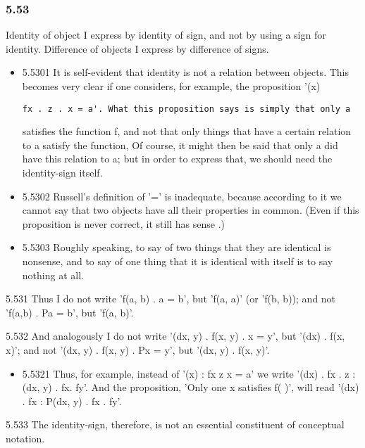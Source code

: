 \documentclass[11pt]{article}
\begin{document}
\subsubsection*{5.53}
\label{sec:org6cc3c69}
Identity of object I express by identity of sign, and not by using a
sign for identity. Difference of objects I express by difference of signs.
\begin{itemize}
\item 5.5301
\label{sec:orgbd5166c}
It is self-evident that identity is not a relation between objects.
This becomes very clear if one considers, for example, the proposition '(x)
\begin{verbatim}
fx . z . x = a'. What this proposition says is simply that only a
\end{verbatim}

satisfies the function f, and not that only things that have a certain
relation to a satisfy the function, Of course, it might then be said that
only a did have this relation to a; but in order to express that, we should
need the identity-sign itself.
\item 5.5302
\label{sec:org147bcad}
Russell's definition of '=' is inadequate, because according to it
we cannot say that two objects have all their properties in common. (Even
if this proposition is never correct, it still has sense .)
\item 5.5303
\label{sec:org18bb089}
Roughly speaking, to say of two things that they are identical is
nonsense, and to say of one thing that it is identical with itself is to
say nothing at all.
\end{itemize}
\item 5.531
\label{sec:org00036c3}
Thus I do not write 'f(a, b) . a = b', but 'f(a, a)' (or 'f(b, b));
and not 'f(a,b) . Pa = b', but 'f(a, b)'.
\item 5.532
\label{sec:orgdfb6bb4}
And analogously I do not write '(dx, y) . f(x, y) . x = y', but '(dx)
. f(x, x)'; and not '(dx, y) . f(x, y) . Px = y', but '(dx, y) . f(x, y)'.
\begin{itemize}
\item 5.5321
\label{sec:org0678b80}
Thus, for example, instead of '(x) : fx z x = a' we write '(dx) . fx
. z : (dx, y) . fx. fy'. And the proposition, 'Only one x satisfies f( )',
will read '(dx) . fx : P(dx, y) . fx . fy'.
\end{itemize}
\item 5.533
\label{sec:org997392f}
The identity-sign, therefore, is not an essential constituent of
conceptual notation.
\end{document}
